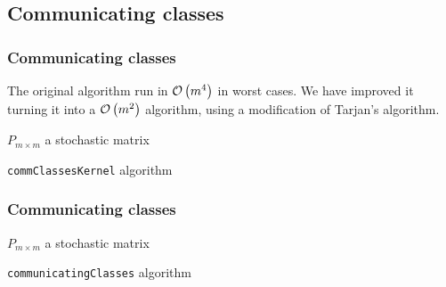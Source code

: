 \subsection{Communicating classes}
 \begin{frame}\frametitle{Communicating classes}
    \vspace{3em}
    The original algorithm run in \(\mathcal{O}\left(m^4\right)\) in worst cases. We have improved it 
    turning it into a \(\mathcal{O}\left(m^2\right)\) algorithm, using a modification of Tarjan's algorithm.
    \vspace{-1em}
    \begin{algorithm}[H]
    \begin{algorithmic}[1]
    \REQUIRE $P_{m \times m}$ a stochastic matrix
    \NEWLINE
        \ENDFOR
        \ENDFOR
        \ENDFOR
    \ENDFOR
    \NEWLINE
    \RETURN{$[C, v]$}
    \end{algorithmic}
    \caption{\small\texttt{commClassesKernel} algorithm}
    \label{alg:commClassesKernel}
    \end{algorithm}

\end{frame}

\begin{frame} \frametitle{Communicating classes}
    \vspace{2em}
    \begin{algorithm}[H]
    \begin{algorithmic}[1]
    \REQUIRE $P_{m \times m}$ a stochastic matrix
    \NEWLINE
            \ENDIF
        \ENDFOR
        \ENDIF
    \ENDFOR
    \NEWLINE
    \end{algorithmic}
    \caption{\small\texttt{communicatingClasses} algorithm}
    \label{alg:commClasses}
    \end{algorithm}
    
\end{frame}
